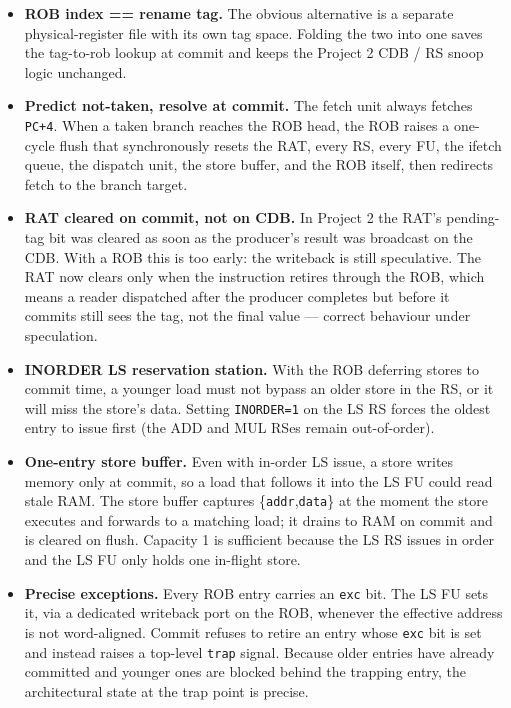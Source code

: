 \documentclass[11pt]{article}
\begin{document}
\begin{itemize}[noitemsep]
  \item \textbf{ROB index == rename tag.} The obvious alternative is a separate
        physical-register file with its own tag space. Folding the two into one
        saves the tag-to-rob lookup at commit and keeps the Project 2 CDB /
        RS snoop logic unchanged.
  \item \textbf{Predict not-taken, resolve at commit.} The fetch unit always
        fetches \texttt{PC+4}. When a taken branch reaches the ROB head, the ROB
        raises a one-cycle flush that synchronously resets the RAT, every RS,
        every FU, the ifetch queue, the dispatch unit, the store buffer, and the
        ROB itself, then redirects fetch to the branch target.
  \item \textbf{RAT cleared on commit, not on CDB.} In Project 2 the RAT's
        pending-tag bit was cleared as soon as the producer's result was
        broadcast on the CDB. With a ROB this is too early: the writeback is
        still speculative. The RAT now clears only when the instruction retires
        through the ROB, which means a reader dispatched after the producer
        completes but before it commits still sees the tag, not the final
        value --- correct behaviour under speculation.
  \item \textbf{INORDER LS reservation station.} With the ROB deferring stores to
        commit time, a younger load must not bypass an older store in the RS, or
        it will miss the store's data. Setting \texttt{INORDER=1} on the LS RS
        forces the oldest entry to issue first (the ADD and MUL RSes remain
        out-of-order).
  \item \textbf{One-entry store buffer.} Even with in-order LS issue, a store
        writes memory only at commit, so a load that follows it into the LS FU
        could read stale RAM. The store buffer captures
        \{\texttt{addr},\texttt{data}\} at the moment the store executes and
        forwards to a matching load; it drains to RAM on commit and is cleared
        on flush. Capacity 1 is sufficient because the LS RS issues in order and
        the LS FU only holds one in-flight store.
  \item \textbf{Precise exceptions.} Every ROB entry carries an \texttt{exc} bit.
        The LS FU sets it, via a dedicated writeback port on the ROB, whenever
        the effective address is not word-aligned. Commit refuses to retire an
        entry whose \texttt{exc} bit is set and instead raises a top-level
        \texttt{trap} signal. Because older entries have already committed and
        younger ones are blocked behind the trapping entry, the architectural
        state at the trap point is precise.
\end{itemize}
\end{document}
